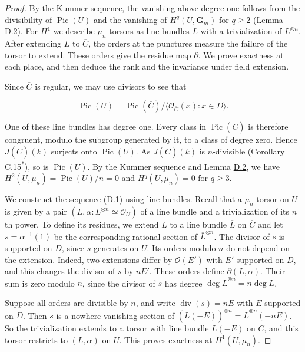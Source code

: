 \documentclass[11pt]{article}
\newcommand{\bpout}[1]{#1\textsuperscript{\hyperlink{bp-outside}{\ensuremath{\ast}}}}
\begin{document}
\begin{proof}[{Proof}]\label{bp16}%
By the Kummer sequence, the vanishing above degree one follows from the divisibility of \(\operatorname{Pic}(U)\) and the vanishing of \(H^q(U,\mathbf G_m)\) for \(q\geq2\) (Lemma \hyperref[bp7]{D.2}). For \(H^1\) we describe \(\mu_n\)-torsors as line bundles \(L\) with a trivialization of \(L^{\otimes n}\). After extending \(L\) to \(\overline C\), the orders at the punctures measure the failure of the torsor to extend. These orders give the residue map \(\partial\). We prove exactness at each place, and then deduce the rank and the invariance under field extension.

Since \(\overline C\) is regular, we may use divisors to see that

\[
\operatorname{Pic}(U)=\operatorname{Pic}(\overline C)/
\langle\mathcal O_{\overline C}(x):x\in D\rangle.
\]

One of these line bundles has degree one. Every class in \(\operatorname{Pic}(\overline C)\) is therefore congruent, modulo the subgroup generated by it, to a class of degree zero. Hence \(J(\overline C)(k)\) surjects onto \(\operatorname{Pic}(U)\). As \(J(\overline C)(k)\) is \(n\)-divisible (Corollary \bpout{C.15}), so is \(\operatorname{Pic}(U)\). By the Kummer sequence and Lemma \hyperref[bp7]{D.2}, we have \(H^2(U,\mu_n)=\operatorname{Pic}(U)/n=0\) and \(H^q(U,\mu_n)=0\) for \(q\geq3\).

We construct the sequence (D.1) using line bundles.  Recall that a \(\mu_n\)-torsor on \(U\) is given by a pair \((L,\alpha:L^{\otimes n}\simeq\mathcal O_U)\) of a line bundle and a trivialization of its \(n\)th power.  To define its residues, we extend \(L\) to a line bundle \(\overline L\) on \(\overline C\) and let \(s=\alpha^{-1}(1)\) be the corresponding rational section of \(\overline L^{\otimes n}\).  The divisor of \(s\) is supported on \(D\), since \(s\) generates on \(U\). Its orders modulo \(n\) do not depend on the extension. Indeed, two extensions differ by \(\mathcal O(E')\) with \(E'\) supported on \(D\), and this changes the divisor of \(s\) by \(nE'\). These orders define \(\partial(L,\alpha)\). Their sum is zero modulo \(n\), since the divisor of \(s\) has degree \(\deg\overline L^{\otimes n}=n\deg\overline L\).

Suppose all orders are divisible by \(n\), and write \(\operatorname{div}(s)=nE\) with \(E\) supported on \(D\). Then \(s\) is a nowhere vanishing section of \((\overline L(-E))^{\otimes n}=\overline L^{\otimes n}(-nE)\). So the trivialization extends to a torsor with line bundle \(\overline L(-E)\) on \(\overline C\), and this torsor restricts to \((L,\alpha)\) on \(U\). This proves exactness at \(H^1(U,\mu_n)\).


\end{proof}
\end{document}
